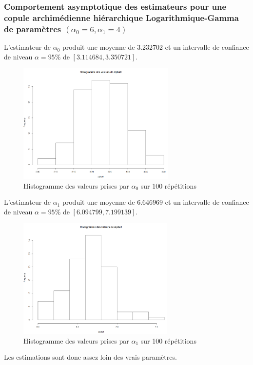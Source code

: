 \documentclass[11pt]{article}
\begin{document}
\subsubsection{Comportement asymptotique des estimateurs pour une copule archimédienne hiérarchique Logarithmique-Gamma de paramètres $(\alpha_{0}=6,\alpha_{1}=4)$}

	L'estimateur de $\alpha_{0}$ produit une moyenne de 3.232702 et un intervalle de confiance de niveau $ \alpha = 95\% $ de $[3.114684,3.350721]$.
	
	\begin{figure}[H]
		\centering
		\includegraphics[height=6cm]{alpha0lg.png}
		\caption[Paramètre $\alpha_{0}$]{Histogramme des valeurs prises par $\alpha_{0}$ sur 100 répétitions} 
		\label{alpha0lg}
	\end{figure}
		
	L'estimateur de $\alpha_{1}$ produit  une moyenne de  6.646969 et un intervalle de confiance de niveau $\alpha = 95\% $ de $[6.094799,7.199139]$.

	\begin{figure}[H]
		\centering
		\includegraphics[height=6cm]{alpha1lg.png}
		\caption[Paramètre $\alpha_{1}$]{Histogramme des valeurs prises par $\alpha_{1}$ sur 100 répétitions} 
		\label{alpha1lg}
	\end{figure}
		
	Les estimations sont donc assez loin des vrais paramètres. 
\end{document}
